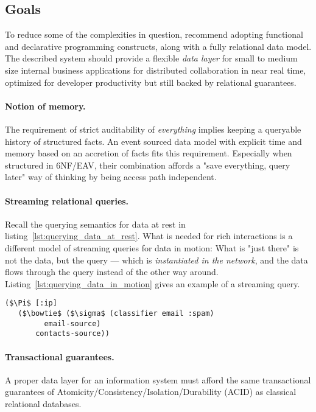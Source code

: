 \subsection{Goals}\label{sec:goals}

To reduce some of the complexities in question, \cite{tarpit} recommend adopting functional and declarative programming constructs, along with a fully relational data model. The described system should provide a flexible \emph{data layer} for small to medium size internal business applications for distributed collaboration in near real time, optimized for developer productivity but still backed by relational guarantees.

\paragraph{Notion of memory.} The requirement of strict auditability of \emph{everything} implies keeping a queryable history of structured facts. An event sourced data model with explicit time and memory based on an accretion of facts fits this requirement. Especially when structured in 6NF/EAV, their combination affords a "save everything, query later" way of thinking by being access path independent.

\paragraph{Streaming relational queries.}
Recall the querying semantics for data at rest in listing~\ref{lst:querying_data_at_rest}. What is needed for rich interactions is a different model of streaming queries for data in motion: What is "just there" is not the data, but the query — which is \emph{instantiated in the network}, and the data flows through the query instead of the other way around. Listing~\ref{lst:querying_data_in_motion} gives an example of a streaming query.

\begin{lstlisting}[label={lst:querying_data_in_motion},morekeywords={email-source,contacts-source},caption=Querying data in motion \cite{alvaro2015isee}]
($\Pi$ [:ip]
   ($\bowtie$ ($\sigma$ (classifier email :spam)
         email-source)
       contacts-source))
\end{lstlisting}

\paragraph{Transactional guarantees.} A proper data layer for an information system must afford the same transactional guarantees of Atomicity/Consistency/Isolation/Durability (ACID) as classical relational databases.

